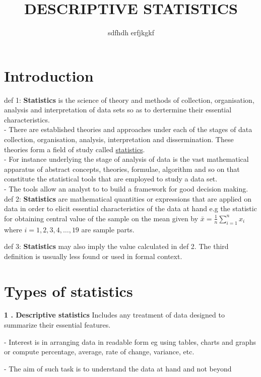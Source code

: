 \documentclass[12pt,a4paper]{article}
\title{DESCRIPTIVE STATISTICS}
\author{sdfhdh erfjkgkf}
\begin{document}
%
\maketitle
\newpage
\tableofcontents
\newpage
\section{Introduction}
\setlength{\parskip}{0.5em} %
def 1: \textbf{Statistics} is the science of theory and methods of collection, organisation, analysis and interpretation of data sets so as to dertermine their essential characteristics. \\ - There are established theories and approaches under each of the stages of data collection, organisation, analysis, interpretation and dissermination. These theories form a field of study called \underline{statistics}. \\ - For instance underlying the stage of analysis of data is the vast mathematical apparatus of abstract concepts, theories, formulae, algorithm and so on that constitute the statistical tools that are employed to study a data set. \\ - The tools allow an analyst to to build a framework for good decision making.
\newline
def 2: \textbf{Statistics} are mathematical quantities or expressions that are applied on data in order to elicit essential characteristics of the data at hand e.g the statistic for obtaining central value of the sample on the mean given by $\bar{x} = \frac{1}{n}\sum_{i = 1}^{n} x_i$ where $i = 1,2,3,4, \dots,19$ are sample parts. \

def 3: \textbf{Statistics} may also imply the value calculated in def 2.
The third definition is ussually less found or used in formal context.

\section{Types of statistics}
\textbf{1 . Descriptive statistics} Includes any treatment of data designed to summarize their essential features.

- Interest is in arranging data in readable form eg using tables, charts and graphs or compute percentage, average, rate of change, variance, etc.

- The aim of such task is to understand the data at hand and not beyond
\end{document}

